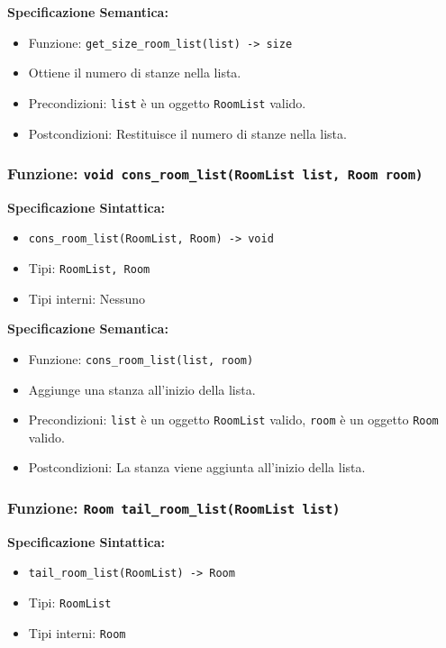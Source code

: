 \documentclass[11pt]{scrartcl} %
\begin{document}
\textbf{Specificazione Semantica:}
\begin{itemize}
\item Funzione: \texttt{get\_size\_room\_list(list) -> size}
\item Ottiene il numero di stanze nella lista.
\item Precondizioni: \texttt{list} è un oggetto \texttt{RoomList} valido.
\item Postcondizioni: Restituisce il numero di stanze nella lista.
\end{itemize}

\subsubsection{Funzione: \texttt{void cons\_room\_list(RoomList list, Room room)}}

\textbf{Specificazione Sintattica:}
\begin{itemize}
\item \texttt{cons\_room\_list(RoomList, Room) -> void}
\item Tipi: \texttt{RoomList, Room}
\item Tipi interni: Nessuno
\end{itemize}

\textbf{Specificazione Semantica:}
\begin{itemize}
\item Funzione: \texttt{cons\_room\_list(list, room)}
\item Aggiunge una stanza all'inizio della lista.
\item Precondizioni: \texttt{list} è un oggetto \texttt{RoomList} valido, \texttt{room} è un oggetto \texttt{Room} valido.
\item Postcondizioni: La stanza viene aggiunta all'inizio della lista.
\end{itemize}

\subsubsection{Funzione: \texttt{Room tail\_room\_list(RoomList list)}}

\textbf{Specificazione Sintattica:}
\begin{itemize}
\item \texttt{tail\_room\_list(RoomList) -> Room}
\item Tipi: \texttt{RoomList}
\item Tipi interni: \texttt{Room}
\end{itemize}
\end{document}

